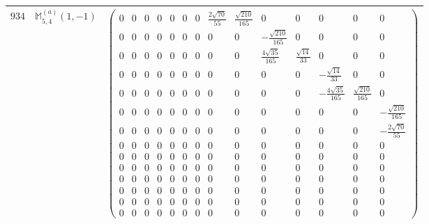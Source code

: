 \documentclass[fleqn,8pt,landscape]{jsarticle}
\begin{document}
\begin{center}
\begin{longtable}{ccc}
$ 934 $ & $ \mathbb{M}_{5,4}^{(a)}(1,-1) $ & $ \begin{pmatrix} 0 & 0 & 0 & 0 & 0 & 0 & 0 & \frac{2 \sqrt{70}}{55} & \frac{\sqrt{210}}{165} & 0 & 0 & 0 & 0 & 0 \\ 0 & 0 & 0 & 0 & 0 & 0 & 0 & 0 & 0 & - \frac{\sqrt{210}}{165} & 0 & 0 & 0 & 0 \\ 0 & 0 & 0 & 0 & 0 & 0 & 0 & 0 & 0 & \frac{4 \sqrt{35}}{165} & \frac{\sqrt{14}}{33} & 0 & 0 & 0 \\ 0 & 0 & 0 & 0 & 0 & 0 & 0 & 0 & 0 & 0 & 0 & - \frac{\sqrt{14}}{33} & 0 & 0 \\ 0 & 0 & 0 & 0 & 0 & 0 & 0 & 0 & 0 & 0 & 0 & - \frac{4 \sqrt{35}}{165} & \frac{\sqrt{210}}{165} & 0 \\ 0 & 0 & 0 & 0 & 0 & 0 & 0 & 0 & 0 & 0 & 0 & 0 & 0 & - \frac{\sqrt{210}}{165} \\ 0 & 0 & 0 & 0 & 0 & 0 & 0 & 0 & 0 & 0 & 0 & 0 & 0 & - \frac{2 \sqrt{70}}{55} \\ 0 & 0 & 0 & 0 & 0 & 0 & 0 & 0 & 0 & 0 & 0 & 0 & 0 & 0 \\ 0 & 0 & 0 & 0 & 0 & 0 & 0 & 0 & 0 & 0 & 0 & 0 & 0 & 0 \\ 0 & 0 & 0 & 0 & 0 & 0 & 0 & 0 & 0 & 0 & 0 & 0 & 0 & 0 \\ 0 & 0 & 0 & 0 & 0 & 0 & 0 & 0 & 0 & 0 & 0 & 0 & 0 & 0 \\ 0 & 0 & 0 & 0 & 0 & 0 & 0 & 0 & 0 & 0 & 0 & 0 & 0 & 0 \\ 0 & 0 & 0 & 0 & 0 & 0 & 0 & 0 & 0 & 0 & 0 & 0 & 0 & 0 \\ 0 & 0 & 0 & 0 & 0 & 0 & 0 & 0 & 0 & 0 & 0 & 0 & 0 & 0 \end{pmatrix} $ \\ \hline

\end{longtable}
\end{center}
\end{document}
